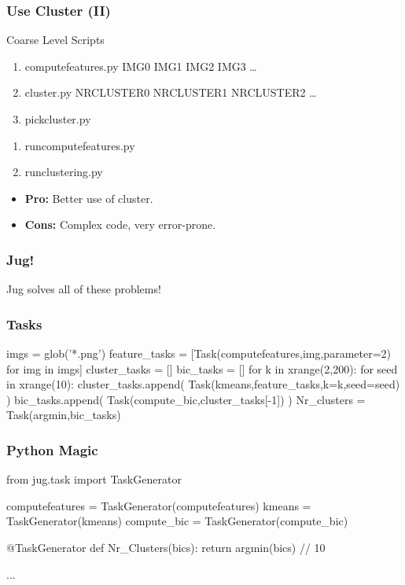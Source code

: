 \documentclass{beamer}
\begin{document}
\begin{frame}[fragile]
\frametitle{Use Cluster (II)}
\begin{block}{Coarse Level Scripts}
\begin{enumerate}
\item computefeatures.py IMG0 IMG1 IMG2 IMG3 \dots
\item cluster.py NRCLUSTER0 NRCLUSTER1 NRCLUSTER2 \dots
\item pickcluster.py
\end{enumerate}
\pause
\begin{enumerate}
\item runcomputefeatures.py
\item runclustering.py
\end{enumerate}
\end{block}

\pause
\begin{itemize}
\item \textbf{Pro:} Better use of cluster.
\item \textbf{Cons:} Complex code, very error-prone.
\end{itemize}
\end{frame}

\begin{frame}[fragile]
\frametitle{Jug!}
Jug solves all of these problems!
\end{frame}

\begin{frame}[fragile]
\frametitle{Tasks}
\begin{python}
imgs = glob('*.png')
feature_tasks = [Task(computefeatures,img,parameter=2)
                    for img in imgs]
cluster_tasks = []
bic_tasks = []
for k in xrange(2,200):
    for seed in xrange(10):
        cluster_tasks.append(
            Task(kmeans,feature_tasks,k=k,seed=seed)
            )
        bic_tasks.append(
            Task(compute_bic,cluster_tasks[-1])
            )
Nr_clusters = Task(argmin,bic_tasks)
\end{python}
\end{frame}

\begin{frame}[fragile]
\frametitle{Python Magic}

\begin{python}
from jug.task import TaskGenerator

computefeatures = TaskGenerator(computefeatures)
kmeans = TaskGenerator(kmeans)
compute_bic = TaskGenerator(compute_bic)

@TaskGenerator
def Nr_Clusters(bics):
    return argmin(bics) // 10

...
\end{python}
\end{frame}
\end{document}
